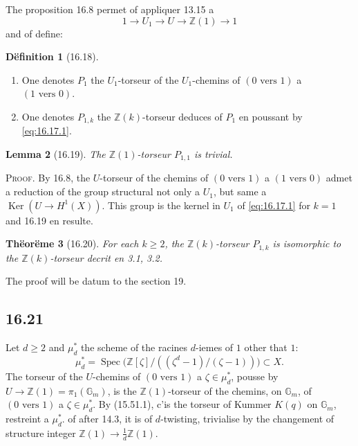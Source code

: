 \documentclass[12pt,a4paper]{article}
\theoremstyle{plain}
\newtheorem{theorem}{Th\"eor\"eme}[section]
\newtheorem{lemma}[theorem]{Lemma}
\theoremstyle{definition}
\newtheorem{definition}[theorem]{D\"efinition}
\theoremstyle{remark}
\DeclareMathOperator{\Ker}{Ker}
\DeclareMathOperator{\Spec}{Spec}
\newcommand{\Gm}{\mathbb{G}_m}
\newcommand{\ZZ}{\mathbb{Z}}
\begin{document}
The proposition 16.8 permet of appliquer 13.15 a
\[
1 \to U_1 \to U \to \ZZ(1) \to 1
\]
and of define:

\begin{definition}[16.18]\label{def:16.18}
\begin{enumerate}
\item[(i)] One denotes $P_1$ the $U_1$-torseur of the $U_1$-chemins of
$(0 \text{ vers } 1)$ a $(1 \text{ vers } 0)$.
\item[(ii)] One denotes $P_{1,k}$ the $\ZZ(k)$-torseur deduces of $P_1$ en
poussant by \eqref{eq:16.17.1}.
\end{enumerate}
\end{definition}

\begin{lemma}[16.19]\label{lem:16.19}
The $\ZZ(1)$-torseur $P_{1,1}$ is trivial.
\end{lemma}

\noindent \textsc{Proof.} By 16.8, the $U$-torseur of the chemins of
$(0 \text{ vers } 1)$ a $(1 \text{ vers } 0)$ admet a reduction of the group
structural not only a $U_1$, but same a
$\Ker(U \to H^1(X))$. This group is the kernel in $U_1$ of
\eqref{eq:16.17.1} for $k=1$ and 16.19 en resulte.

\begin{theorem}[16.20]\label{thm:16.20}
For each $k \geq 2$, the $\ZZ(k)$-torseur $P_{1,k}$ is isomorphic to the
$\ZZ(k)$-torseur decrit en 3.1, 3.2.
\end{theorem}

The proof will be datum to the section 19.

\subsection*{16.21}

Let $d \geq 2$ and $\mu_d^*$ the scheme of the racines $d$-iemes of $1$
other that $1$:
\[
\mu_d^* = \Spec\bigl(\ZZ[\zeta]/((\zeta^d-1)/(\zeta-1))\bigr) \subset X.
\]
The torseur of the $U$-chemins of $(0 \text{ vers } 1)$ a
$\zeta \in \mu_d^*$, pousse by $U \to \ZZ(1) = \pi_1(\Gm)$, is the
$\ZZ(1)$-torseur of the chemins, on $\Gm$, of $(0 \text{ vers } 1)$ a
$\zeta \in \mu_d^*$. By (15.51.1), c'is the torseur of Kummer $K(q)$ on
$\Gm$, restreint a $\mu_d^*$. of after 14.3, it is of $d$-twisting,
trivialise by the changement of structure integer
$\ZZ(1) \to \frac{1}{d}\ZZ(1)$.
\end{document}

